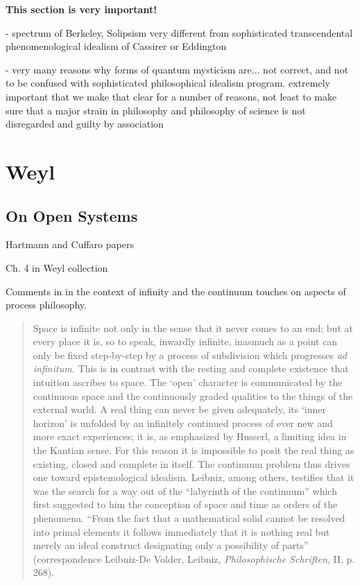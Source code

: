 \textbf{This section is very important!}

- spectrum of Berkeley, Solipsism very different from sophisticated transcendental phenomenological idealism of Cassirer or Eddington  

- very many reasons why forms of quantum mysticism are... not correct, and not to be confused with sophisticated philosophical idealism program.  extremely important that we make that clear for a number of reasons, not least to make sure that a major strain in philosophy and philosophy of science is not disregarded and guilty by association












\section{Weyl}

\subsection{On Open Systems}

Hartmann and Cuffaro papers

Ch. 4 in Weyl collection 

Comments in \cite{Weyl1949} in the context of infinity and the continuum touches on aspects of process philosophy.

\begin{quote}
    Space is infinite not only in the sense that it never comes to an end; but at every place it is, so to speak, inwardly infinite, inasmuch as a point can only be fixed step-by-step by a process of subdivision which progresses \emph{ad infinitum.}  This is in contrast with the resting and complete existence that intuition ascribes to space.  The `open' character is communicated by the continuous space and the continuously graded qualities to the things of the external world.  A real thing can never be given adequately, its `inner horizon' is unfolded by an infinitely continued process of ever new and more exact experiences; it is, as emphasized by Husserl, a limiting idea in the Kantian sense.  For this reason it is impossible to posit the real thing as existing, closed and complete in itself.  The continuum problem thus drives one toward epistemological idealism.  Leibniz, among others, testifies that it was the search for a way out of the ``labyrinth of the continuum'' which first suggested to him the conception of space and time as orders of the phenomena.  ``From the fact that a mathematical solid cannot be resolved into primal elements it follows immediately that it is nothing real but merely an ideal construct designating only a possibility of parts'' (correspondence Leibniz-De Volder, Leibniz, \emph{Philosophische Schriften}, II, p. 268).

    \citep[p. 41]{Weyl1949}
\end{quote}


